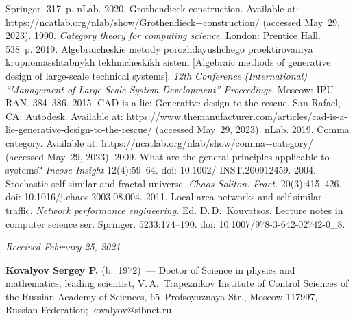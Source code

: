 \begin{multicols}{2}
{{\begin{thebibliography}{99}
Springer. 317~p.
   nLab. 2020. Grothendieck construction. Available at: {\sf 
https://ncatlab.org/nlab/show/Grothendieck+\linebreak construction/} (accessed May~29, 2023).
    1990. \textit{Category theory for computing science}. London: 
Prentice Hall. 538~p.
    2019. Algebraicheskie metody porozhdayushchego proektirovaniya 
krupnomasshtabnykh tekhnicheskikh sistem [Algebraic methods of generative design of large-scale 
technical systems]. \textit{12th Conference (International) ``Management of Large-Scale System 
Development'' Proceedings}. Moscow: IPU RAN. 384--386.
    2015. CAD is a lie: Generative design to the rescue. San Rafael, CA: Autodesk. Available at: {\sf 
https://www.themanufacturer.com/articles/cad-is-a-lie-generative-design-to-the-rescue/} (accessed May~29, 
2023).
   nLab. 2019. Comma category. Available at: {\sf  
https://\linebreak ncatlab.org/nlab/show/comma+category/} (accessed May~29, 2023).
    2009. What are the general principles applicable to systems? \textit{Incose 
Insight} 12(4):59--64. doi: 10.1002/ INST.200912459.
    2004. Stochastic self-similar and fractal 
universe.  \textit{Chaos Soliton. Fract.} 20(3):415--426. doi: 10.1016/j.chaos.2003.08.004.
    2011. Local area networks and self-similar traffic. \textit{Network 
performance engineering.} Ed. D.\,D.~Kouvatsos. Lecture notes in computer science ser. Springer. 
5233:174--190. doi: 10.1007/978-3-642-02742-0\_8.
   \end{thebibliography}

 }
 }

\end{multicols}

\vspace*{-9pt}

\hfill{\small\textit{Received February 25, 2021}} 
   
   
   \vspace*{-22pt}
   
\Contrl

\vspace*{-4pt}

\noindent
\textbf{Kovalyov Sergey P.} (b.\ 1972)~--- Doctor of Science in physics and mathematics, leading scientist, 
V.\,A.~Trapeznikov Institute of Control Sciences of the Russian Academy of Sciences, 65~Profsoyuznaya Str., Moscow 
117997, Russian Federation; \mbox{kovalyov@sibnet.ru}
   
   

   
\label{end\stat}

\renewcommand{\bibname}{\protect\rm Литература} 
   